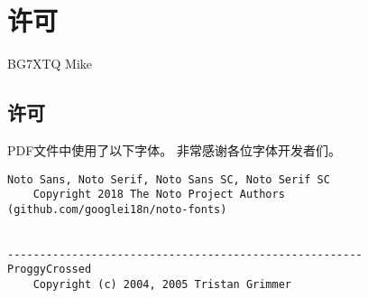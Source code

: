 \chapter*{许可}

\noindent {} BG7XTQ Mike

\section*{许可}

\noindent PDF文件中使用了以下字体。
非常感谢各位字体开发者们。

\begin{lstlisting}[numbers=none]
Noto Sans, Noto Serif, Noto Sans SC, Noto Serif SC
    Copyright 2018 The Noto Project Authors (github.com/googlei18n/noto-fonts)


-------------------------------------------------------
ProggyCrossed
    Copyright (c) 2004, 2005 Tristan Grimmer
\end{lstlisting}
